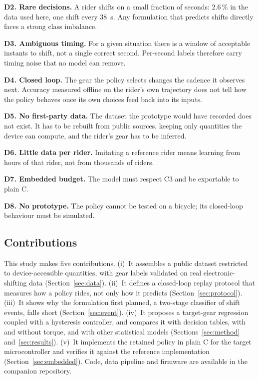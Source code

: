 \documentclass[conference]{IEEEtran}
\newcommand{\pct}{\,\%}
\begin{document}
\textbf{D2. Rare decisions.} A rider shifts on a small fraction of seconds: 2.6\pct{} in the data used here, one shift every 38~s. Any formulation that predicts shifts directly faces a strong class imbalance.

\textbf{D3. Ambiguous timing.} For a given situation there is a window of acceptable instants to shift, not a single correct second. Per-second labels therefore carry timing noise that no model can remove.

\textbf{D4. Closed loop.} The gear the policy selects changes the cadence it observes next. Accuracy measured offline on the rider's own trajectory does not tell how the policy behaves once its own choices feed back into its inputs.

\textbf{D5. No first-party data.} The dataset the prototype would have recorded does not exist. It has to be rebuilt from public sources, keeping only quantities the device can compute, and the rider's gear has to be inferred.

\textbf{D6. Little data per rider.} Imitating a reference rider means learning from hours of that rider, not from thousands of riders.

\textbf{D7. Embedded budget.} The model must respect C3 and be exportable to plain C.

\textbf{D8. No prototype.} The policy cannot be tested on a bicycle; its closed-loop behaviour must be simulated.

\subsection{Contributions}
This study makes five contributions. (i)~It assembles a public dataset restricted to device-accessible quantities, with gear labels validated on real electronic-shifting data (Section~\ref{sec:data}). (ii)~It defines a closed-loop replay protocol that measures how a policy rides, not only how it predicts (Section~\ref{sec:protocol}). (iii)~It shows why the formulation first planned, a two-stage classifier of shift events, falls short (Section~\ref{sec:event}). (iv)~It proposes a target-gear regression coupled with a hysteresis controller, and compares it with decision tables, with and without torque, and with other statistical models (Sections~\ref{sec:method} and~\ref{sec:results}). (v)~It implements the retained policy in plain C for the target microcontroller and verifies it against the reference implementation (Section~\ref{sec:embedded}). Code, data pipeline and firmware are available in the companion repository.
\end{document}
